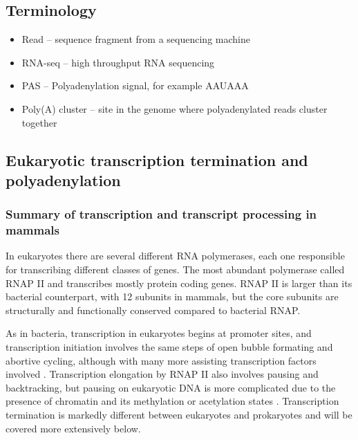 %


\subsection{Terminology}
\begin{itemize}
	\item Read -- sequence fragment from a sequencing machine
	\item RNA-seq -- high throughput RNA sequencing
	\item PAS -- Polyadenylation signal, for example AAUAAA
	\item Poly(A) cluster -- site in the genome where polyadenylated reads
		cluster together
\end{itemize}

\subsection{Eukaryotic transcription termination and polyadenylation}

\subsubsection{Summary of transcription and transcript processing in mammals}
In eukaryotes there are several different RNA polymerases, each one responsible
for transcribing different classes of genes. The most abundant polymerase
called RNAP II and transcribes mostly protein coding genes. RNAP II is larger
than its bacterial counterpart, with 12 subunits in mammals, but the core
subunits are structurally and functionally conserved compared to bacterial
RNAP.

As in bacteria, transcription in eukaryotes begins at promoter sites, and
transcription initiation involves the same steps of open bubble formating and
abortive cycling, although with many more assisting transcription factors
involved \cite{wade_transition_2008}. Transcription elongation by RNAP II also
involves pausing and backtracking, but pausing on eukaryotic DNA is more
complicated due to the presence of chromatin and its methylation or acetylation
states \cite{sims_elongation_2004}. Transcription termination is markedly
different between eukaryotes and prokaryotes and will be covered more
extensively below.

